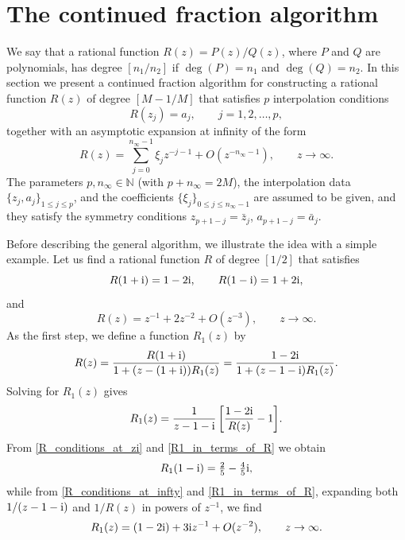 \documentclass[12pt]{article}
\def\i{{\textnormal i}}
\begin{document}
\section{The continued fraction algorithm}\label{section_Continued_Fractions}


We say that a rational function $R(z)=P(z)/Q(z)$, where $P$ and $Q$ are polynomials, has degree $[n_1/n_2]$ if $\deg(P)=n_1$ and
$\deg(Q)=n_2$. 
In this section we present a continued fraction algorithm for constructing a rational function $R(z)$ of degree $[M-1/M]$ that satisfies $p$ interpolation conditions
\begin{equation}\label{R_conditions_at_zj}
R(z_j)=a_j,  \qquad j=1,2,\dots,p,
\end{equation}
together with an asymptotic expansion at infinity of the form
\begin{equation}\label{eqn:R_at_infty2}
R(z)=\sum_{j=0}^{n_{\infty}-1} \xi_{j} z^{-j-1}+O(z^{-n_{\infty}-1}), \qquad z\to \infty.
\end{equation}
The parameters $p, n_{\infty} \in \mathbb{N}$ (with $p+n_{\infty}=2M$), the interpolation data $\{z_j, a_j\}_{1\le j \le p}$, and the coefficients $\{\xi_j\}_{0\le j \le n_{\infty}-1}$ are assumed to be given, and they satisfy the symmetry conditions $z_{p+1-j}=\bar z_j$, $a_{p+1-j}=\bar a_j$.  

Before describing the general algorithm, we illustrate the idea with a simple example. Let us find a rational function $R$ of degree $[1/2]$ that satisfies
\begin{equation}\label{R_conditions_at_zi}
R(1+\i)=1-2\i, \qquad R(1-\i)=1+2\i,
\end{equation}
and 
\begin{equation}\label{R_conditions_at_infty}
R(z)=z^{-1} + 2 z^{-2} + O(z^{-3}), \qquad z\to \infty.  
\end{equation}
As the first step, we define a function $R_1(z)$ by  
\begin{equation}\label{R_in_terms_of_R1}
R(z)=\frac{R(1+\i)}{1+(z-(1+\i)) R_1(z)}= \frac{1-2\i}{1+(z-1-\i) R_1(z)}. 
\end{equation}
Solving for $R_1(z)$ gives
\begin{equation}\label{R1_in_terms_of_R}
R_1(z)=\frac{1}{z-1-\i}\,\bigg[ \frac{1-2\i}{R(z)} - 1 \bigg].
\end{equation}
From \eqref{R_conditions_at_zi} and \eqref{R1_in_terms_of_R} we obtain
\begin{equation}\label{R1_conditions_at_zi}
R_1(1-\i)=\tfrac{2}{5}-\tfrac{4}{5}\i,
\end{equation}
while from \eqref{R_conditions_at_infty} and \eqref{R1_in_terms_of_R}, expanding both $1/(z-1-\i)$ and $1/R(z)$ in powers of $z^{-1}$, we find
\begin{equation}\label{R1_conditions_at_infty}
R_1(z)=(1-2\i)+3\i z^{-1} + O(z^{-2}), \qquad z\to \infty. 
\end{equation}
\end{document}
